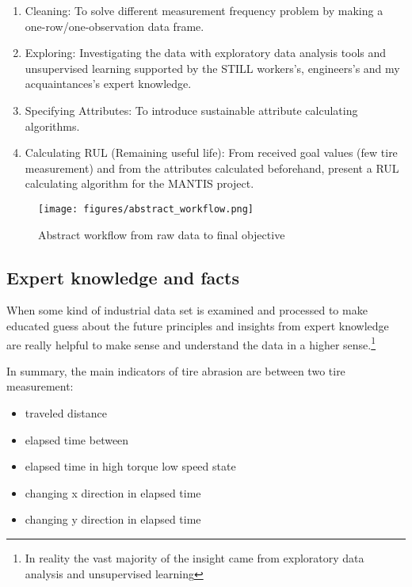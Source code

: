 \begin{enumerate}
	\item {Cleaning:} To solve different measurement frequency problem by making a one-row/one-observation data frame.
	\item {Exploring:} Investigating the data with exploratory data analysis tools and unsupervised learning supported by the STILL workers's, engineers's and my acquaintances's expert knowledge.
 	\item {Specifying Attributes:} To introduce sustainable attribute calculating algorithms.
 	\item {Calculating RUL (Remaining useful life):} From received goal values (few tire measurement) and from the attributes calculated beforehand, present a RUL calculating algorithm for the MANTIS project.
\end{enumerate}

\begin{figure}[!ht]
\centering
\texttt{[image: figures/abstract\_workflow.png]}
\caption{Abstract workflow from raw data to final objective} 
\end{figure}

\subsection{Expert knowledge and facts}
\noindent
When some kind of industrial data set is examined and processed to make educated guess about the future principles and insights from expert knowledge are really helpful to make sense and understand the data in a higher sense.\footnote{In reality the vast majority of the insight came from exploratory data analysis and unsupervised learning}

\noindent
In summary, the main indicators of tire abrasion are between two tire measurement:
\begin{itemize}
	\item{traveled distance} 
	\item{elapsed time between}
	\item{elapsed time in high torque low speed state}
	\item{changing x direction in elapsed time}
	\item{changing y direction in elapsed time}
\end{itemize}

